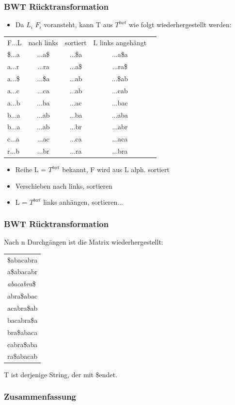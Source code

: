 \documentclass{beamer}
\begin{document}
\begin{frame}
\frametitle{BWT Rücktransformation}
\begin{itemize}
\item Da $L_i$ $F_i$ voransteht, kann T aus $T^{bwt}$ wie folgt wiederhergestellt werden:
\end{itemize}
\begin{tabular}{l c cc r}
F...L & nach links &sortiert& L links angehängt\\
\$...a &...a\$ &...\$a&...a\$a\\
a...r &...ra &...a\$&...ra\$\\
a...\$ &...\$a &...ab&...\$ab\\
a...c &...ca &...ab&...cab\\
a...b &...ba &...ac&...bac\\
b...a &...ab &...ba&...aba\\
b...a &...ab &...br&...abr\\
c...a &...ac &...ca&...aca\\
r...b &...br &...ra&...bra\\
\end{tabular}
\begin{itemize}
\item Reihe L = $T^{bwt}$ bekannt, F wird aus L alph. sortiert
\item Verschieben \glqq nach links\grqq, sortieren
\item L = $T^{bwt}$ links \glqq anhängen, sortieren...
\end{itemize}
\end{frame}
\begin{frame}
\frametitle{BWT Rücktransformation}
Nach n Durchgängen ist die Matrix wiederhergestellt:\newline
\begin{tabular}{l}
\$abacabra \\
a\$abacabr \\
\color{red}\textit{abacabra}\$ \\
abra\$abac \\
acabra\$ab \\
bacabra\$a \\
bra\$abaca \\
cabra\$aba \\
ra\$abacab \\
\end{tabular}
\newline T ist derjenige String, der mit \glqq\$\grqq endet.
\end{frame}
\begin{frame}
 \frametitle{Zusammenfassung}
\end{frame}
\end{document}
